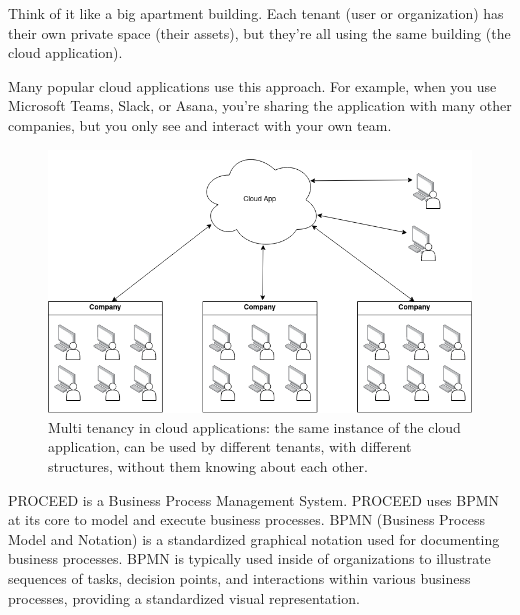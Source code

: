 
Think of it like a big apartment building. Each tenant (user or organization) has their
own private space (their assets), but they're all using the same building (the
cloud application).

Many popular cloud applications use this approach. For example, when you use Microsoft Teams,
Slack, or Asana, you're sharing the application with many other companies, but you only
see and interact with your own team.

\begin{figure}[H]
    \centering
    \includegraphics[scale=0.45]{images/mt-cloud-services.png}
    \caption{Multi tenancy in cloud applications: the same instance of the cloud
    application, can be used by different tenants, with different structures, without them knowing about each other.}
    \vspace{-1em} %
    \label{fig:multi-tenant=cloud-applications}
\end{figure}

PROCEED%
is a Business Process Management System.
PROCEED uses BPMN at its core to model and execute business processes.
BPMN (Business Process Model and Notation) is a standardized graphical notation used for documenting business processes.
BPMN is typically used inside of organizations to illustrate sequences of tasks,
decision points, and interactions within various business processes, providing a standardized visual representation.

